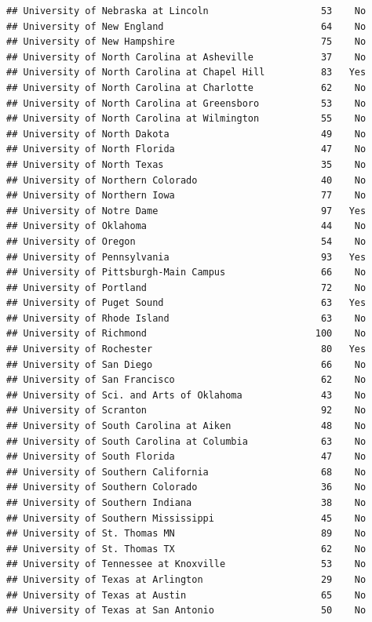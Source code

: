 \documentclass[
]{article}
\begin{document}
\begin{verbatim}
## University of Nebraska at Lincoln                    53    No
## University of New England                            64    No
## University of New Hampshire                          75    No
## University of North Carolina at Asheville            37    No
## University of North Carolina at Chapel Hill          83   Yes
## University of North Carolina at Charlotte            62    No
## University of North Carolina at Greensboro           53    No
## University of North Carolina at Wilmington           55    No
## University of North Dakota                           49    No
## University of North Florida                          47    No
## University of North Texas                            35    No
## University of Northern Colorado                      40    No
## University of Northern Iowa                          77    No
## University of Notre Dame                             97   Yes
## University of Oklahoma                               44    No
## University of Oregon                                 54    No
## University of Pennsylvania                           93   Yes
## University of Pittsburgh-Main Campus                 66    No
## University of Portland                               72    No
## University of Puget Sound                            63   Yes
## University of Rhode Island                           63    No
## University of Richmond                              100    No
## University of Rochester                              80   Yes
## University of San Diego                              66    No
## University of San Francisco                          62    No
## University of Sci. and Arts of Oklahoma              43    No
## University of Scranton                               92    No
## University of South Carolina at Aiken                48    No
## University of South Carolina at Columbia             63    No
## University of South Florida                          47    No
## University of Southern California                    68    No
## University of Southern Colorado                      36    No
## University of Southern Indiana                       38    No
## University of Southern Mississippi                   45    No
## University of St. Thomas MN                          89    No
## University of St. Thomas TX                          62    No
## University of Tennessee at Knoxville                 53    No
## University of Texas at Arlington                     29    No
## University of Texas at Austin                        65    No
## University of Texas at San Antonio                   50    No

\end{verbatim}
\end{document}
